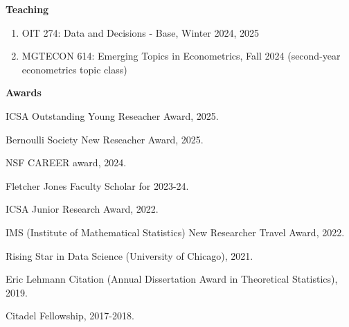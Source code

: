 \documentclass{article}
\begin{document}
\vspace{3mm}
\begin{large}
\noindent \textbf{Teaching}
\end{large}

\begin{enumerate}
\item OIT 274: Data and Decisions - Base, Winter 2024, {\color{red}2025}
\item {\color{red}MGTECON 614: Emerging Topics in Econometrics, Fall 2024 (second-year econometrics topic class)}
\end{enumerate}

\vspace{3mm}
\begin{large}
\noindent \textbf{Awards}
\end{large}

\vspace{5mm}

{\color{red}ICSA Outstanding Young Reseacher Award, 2025.}

\vspace{2mm}

{\color{red}Bernoulli Society New Reseacher Award, 2025.}

\vspace{2mm}

NSF CAREER award, 2024.

\vspace{2mm}

Fletcher Jones Faculty Scholar for 2023-24. 

\vspace{2mm}

ICSA Junior Research Award, 2022.

\vspace{2mm}

IMS (Institute of Mathematical Statistics) New Researcher Travel Award, 2022.

\vspace{2mm}

Rising Star in Data Science (University of Chicago), 2021.

\vspace{2mm}

Eric Lehmann Citation (Annual Dissertation Award in Theoretical Statistics), 2019.

\vspace{2mm}

Citadel Fellowship, 2017-2018.

\vspace{2mm}
\end{document}
